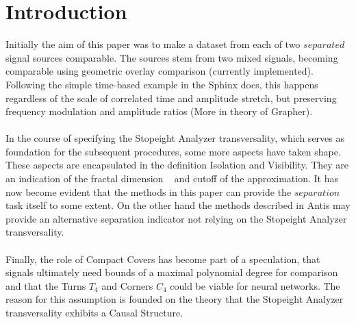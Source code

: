 \documentclass{report}
\begin{document}
\section{Introduction}
Initially the aim of this paper was to make a dataset from each of two $separated$ signal sources comparable. The sources stem from two mixed signals, becoming comparable using geometric overlay comparison (currently implemented). Following the simple time-based example in the Sphinx docs, this happens regardless of the scale of correlated time and amplitude stretch, but preserving frequency modulation and amplitude ratios (More in theory of Grapher).\\\\
In the course of specifying the Stopeight Analyzer transversality, which serves as foundation for the subsequent procedures, some more aspects have taken shape. These aspects are encapsulated in the definition Isolation and Visibility. They are an indication of the fractal dimension ~\cite{Widon} and cutoff of the approximation. It has now become evident that the methods in this paper can provide the $separation$ task itself to some extent. On the other hand the methods described in Antis \cite{Antis} may provide an alternative separation indicator not relying on the Stopeight Analyzer transversality.\\\\
Finally, the role of Compact Covers has become part of a speculation, that signals ultimately need bounds of a maximal polynomial degree for comparison and that the Turns $T_{4}$ and Corners $C_{4}$ could be viable for neural networks. The reason for this assumption is founded on the theory that the Stopeight Analyzer transversality exhibits a Causal Structure.
\end{document}
